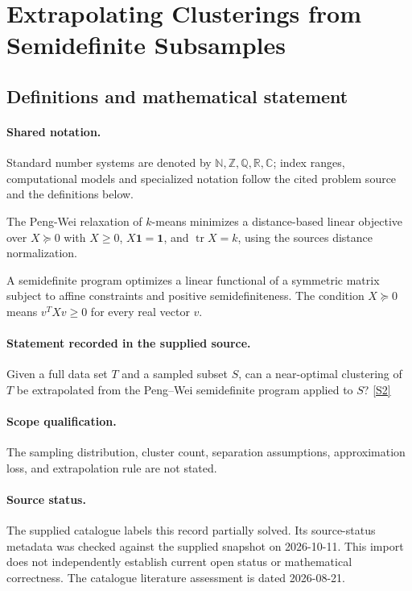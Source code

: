 \documentclass[11pt]{article}
\newcommand{\sref}[2]{\hyperlink{source:#1:#2}{[S#2]}}
\begin{document}
\section{Extrapolating Clusterings from Semidefinite Subsamples}\label{statement}

\subsection{Definitions and mathematical statement}

\paragraph{Shared notation.}Standard number systems are denoted by $\mathbb N,\mathbb Z,\mathbb Q,\mathbb R,\mathbb C$; index ranges, computational models and specialized notation follow the cited problem source and the definitions below.


The Peng-Wei relaxation of $k$-means minimizes a distance-based linear objective over $X\succeq0$ with $X\geq0$, $X\mathbf1=\mathbf1$, and $\operatorname{tr}X=k$, using the source\textquotesingle s distance normalization.

A semidefinite program optimizes a linear functional of a symmetric matrix subject to affine constraints and positive semidefiniteness. The condition $X\succeq0$ means $v^TXv\geq0$ for every real vector $v$.
\paragraph{Statement recorded in the supplied source.}
Given a full data set $T$ and a sampled subset $S$, can a near-optimal clustering of $T$ be extrapolated from the Peng–Wei semidefinite program applied to $S$? \sref{statement}{2}
\paragraph{Scope qualification.}
The sampling distribution, cluster count, separation assumptions, approximation loss, and extrapolation rule are not stated.
\paragraph{Source status.}
The supplied catalogue labels this record partially solved. Its source-status metadata was checked against the supplied snapshot on 2026-10-11. This import does not independently establish current open status or mathematical correctness. The catalogue literature assessment is dated 2026-08-21.
\end{document}
